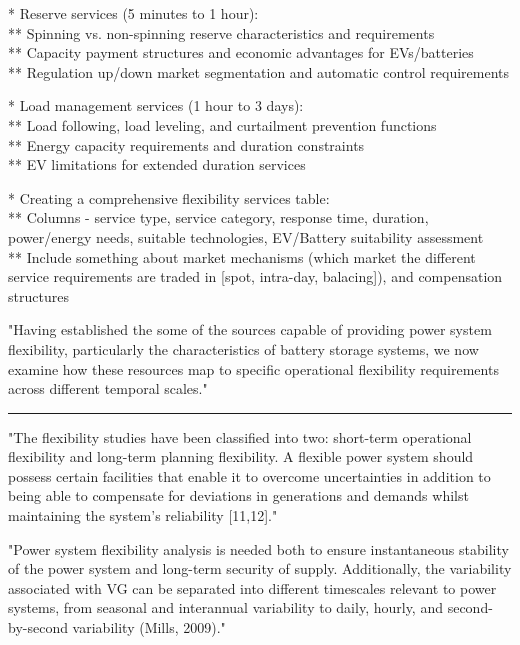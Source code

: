* Reserve services (5 minutes to 1 hour): \\
** Spinning vs. non-spinning reserve characteristics and requirements \\
** Capacity payment structures and economic advantages for EVs/batteries \\
** Regulation up/down market segmentation and automatic control requirements 

* Load management services (1 hour to 3 days): \\
** Load following, load leveling, and curtailment prevention functions \\
** Energy capacity requirements and duration constraints \\
** EV limitations for extended duration services

* Creating a comprehensive flexibility services table: \\
** Columns - service type, service category, response time, duration, power/energy needs, suitable technologies, EV/Battery suitability assessment \\
** Include something about market mechanisms (which market the different service requirements are traded in [spot, intra-day, balacing]), and compensation structures



"Having established the some of the sources capable of providing power system flexibility, particularly the characteristics of battery storage systems, we now examine how these resources map to specific operational flexibility requirements across different temporal scales."
\hrule

"The flexibility studies have been classified into two: short-term operational flexibility and long-term planning flexibility. A flexible power system should possess certain facilities that enable it to overcome uncertainties in addition to being able to compensate for deviations in generations and demands whilst maintaining the system’s reliability [11,12]." \cite{salman_review_2022}

"Power system flexibility analysis is needed both to ensure instantaneous stability of the power system and long-term security of supply. Additionally, the variability associated with VG can be separated into different timescales relevant to power systems, from seasonal and interannual variability to daily, hourly, and second-by-second variability (Mills, 2009)." \cite{michael_emmanuel_review_2020}




